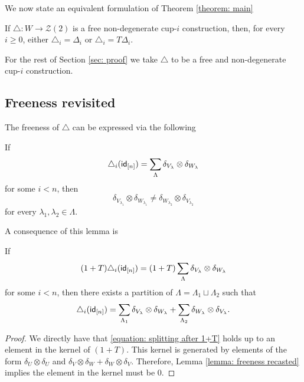 We now state an equivalent formulation of Theorem \ref{theorem: main}

\begin{theorem} \label{theorem: main reformulated}
	If $\triangle : W \to \mathcal{Z}(2)$ is a free non-degenerate cup-$i$ construction, then, for every $i \geq 0$, either $\triangle_i = \Delta_i$ or $\triangle_i = T \Delta_i$.
\end{theorem}

For the rest of Section \ref{sec: proof} we take $\triangle$ to be a free and non-degenerate cup-$i$ construction.

\subsection{Freeness revisited}

The freeness of $\triangle$ can be expressed via the following
\begin{lemma} \label{lemma: freeness recasted}
	If
	\[
	\triangle_i(\mathsf{id}_{[n]}) = \sum_{\Lambda} \delta_{V_\lambda} \otimes \delta_{W_\lambda}
	\]
	for some $i < n$, then
	\[
	\delta_{V_{\lambda_1}} \otimes \delta_{W_{\lambda_1}} \neq
	\delta_{W_{\lambda_2}} \otimes \delta_{V_{\lambda_2}}
	\]
	for every $\lambda_1, \lambda_2 \in \Lambda$.
\end{lemma}

A consequence of this lemma is

\begin{lemma} \label{lemma: (1+T) triangle = 0 implies triangle = 0}
    If
    \[
    (1 + T) \triangle_i(\mathsf{id}_{[n]}) = (1 + T) \sum_{\Lambda} \delta_{V_\lambda} \otimes \delta_{W_\lambda}
    \]
    for some $i < n$, then there exists a partition of $\Lambda = \Lambda_1 \sqcup \Lambda_2$ such that
    \begin{equation} \label{equation: splitting after 1+T}
    \triangle_i(\mathsf{id}_{[n]}) = \sum_{\Lambda_1} \delta_{V_\lambda} \otimes \delta_{W_\lambda} + \sum_{\Lambda_2} \delta_{W_\lambda} \otimes \delta_{V_\lambda}.
    \end{equation}
\end{lemma}

\begin{proof}
	We directly have that \eqref{equation: splitting after 1+T} holds up to an element in the kernel of $(1+T)$. This kernel is generated by elements of the form $\delta_U \otimes \delta_U$ and $\delta_V \otimes \delta_W + \delta_W \otimes \delta_V$. Therefore, Lemma \ref{lemma: freeness recasted} implies the element in the kernel must be $0$.
\end{proof}

